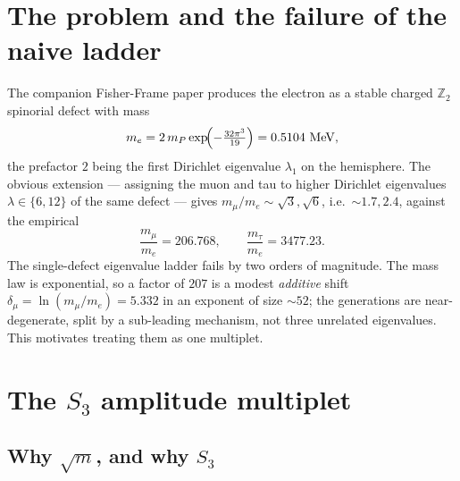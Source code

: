 \documentclass[12pt]{article}
\theoremstyle{definition}
\theoremstyle{remark}
\begin{document}
\tableofcontents

\section{The problem and the failure of the naive ladder}

The companion Fisher-Frame paper produces the electron as a stable charged
$\mathbb{Z}_2$ spinorial defect with mass
\begin{equation}
m_e = 2\,m_P\exp\!\Bigl(-\tfrac{32\pi^3}{19}\Bigr) = 0.5104\ \mathrm{MeV},
\end{equation}
the prefactor $2$ being the first Dirichlet eigenvalue $\lambda_1$ on the
hemisphere. The obvious extension --- assigning the muon and tau to higher
Dirichlet eigenvalues $\lambda\in\{6,12\}$ of the same defect --- gives
$m_\mu/m_e\sim\sqrt{3},\sqrt{6}$, i.e.\ $\sim1.7,2.4$, against the empirical
\begin{equation}
\frac{m_\mu}{m_e}=206.768,\qquad \frac{m_\tau}{m_e}=3477.23.
\end{equation}
The single-defect eigenvalue ladder fails by two orders of magnitude. The
mass law is exponential, so a factor of $207$ is a modest \emph{additive}
shift $\delta_\mu=\ln(m_\mu/m_e)=5.332$ in an exponent of size $\sim52$; the
generations are near-degenerate, split by a sub-leading mechanism, not three
unrelated eigenvalues. This motivates treating them as one multiplet.

\section{The $S_3$ amplitude multiplet}

\subsection{Why $\sqrt m$, and why $S_3$}
\end{document}
